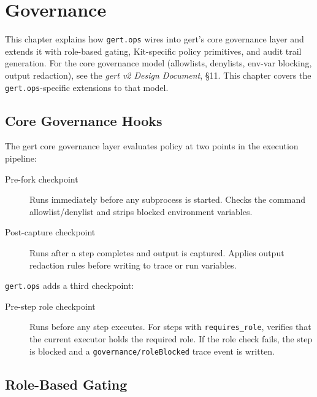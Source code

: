 \chapter{Governance}
\label{ch:governance}

This chapter explains how \texttt{gert.ops} wires into gert's core governance layer and extends
it with role-based gating, Kit-specific policy primitives, and audit trail generation. For the
core governance model (allowlists, denylists, env-var blocking, output redaction), see the
\emph{gert v2 Design Document}, §11. This chapter covers the \texttt{gert.ops}-specific
extensions to that model.

\section{Core Governance Hooks}
\label{sec:governance-core-hooks}

The gert core governance layer evaluates policy at two points in the execution pipeline:

\begin{description}
  \item[Pre-fork checkpoint] Runs immediately before any subprocess is started. Checks the
    command allowlist/denylist and strips blocked environment variables.
  \item[Post-capture checkpoint] Runs after a step completes and output is captured. Applies
    output redaction rules before writing to trace or run variables.
\end{description}

\texttt{gert.ops} adds a third checkpoint:

\begin{description}
  \item[Pre-step role checkpoint] Runs before any step executes. For steps with
    \texttt{requires\_role}, verifies that the current executor holds the required role.
    If the role check fails, the step is blocked and a \texttt{governance/roleBlocked} trace
    event is written.
\end{description}

\section{Role-Based Gating}
\label{sec:governance-role-gating}

